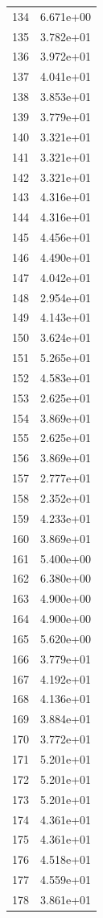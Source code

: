 \documentclass[12pt]{article}
\begin{document}
\begin{longtable}{@{}cc@{}}
134 & 6.671e+00 \\
135 & 3.782e+01 \\
136 & 3.972e+01 \\
137 & 4.041e+01 \\
138 & 3.853e+01 \\
139 & 3.779e+01 \\
140 & 3.321e+01 \\
141 & 3.321e+01 \\
142 & 3.321e+01 \\
143 & 4.316e+01 \\
144 & 4.316e+01 \\
145 & 4.456e+01 \\
146 & 4.490e+01 \\
147 & 4.042e+01 \\
148 & 2.954e+01 \\
149 & 4.143e+01 \\
150 & 3.624e+01 \\
151 & 5.265e+01 \\
152 & 4.583e+01 \\
153 & 2.625e+01 \\
154 & 3.869e+01 \\
155 & 2.625e+01 \\
156 & 3.869e+01 \\
157 & 2.777e+01 \\
158 & 2.352e+01 \\
159 & 4.233e+01 \\
160 & 3.869e+01 \\
161 & 5.400e+00 \\
162 & 6.380e+00 \\
163 & 4.900e+00 \\
164 & 4.900e+00 \\
165 & 5.620e+00 \\
166 & 3.779e+01 \\
167 & 4.192e+01 \\
168 & 4.136e+01 \\
169 & 3.884e+01 \\
170 & 3.772e+01 \\
171 & 5.201e+01 \\
172 & 5.201e+01 \\
173 & 5.201e+01 \\
174 & 4.361e+01 \\
175 & 4.361e+01 \\
176 & 4.518e+01 \\
177 & 4.559e+01 \\
178 & 3.861e+01 \\

\end{longtable}
\end{document}
